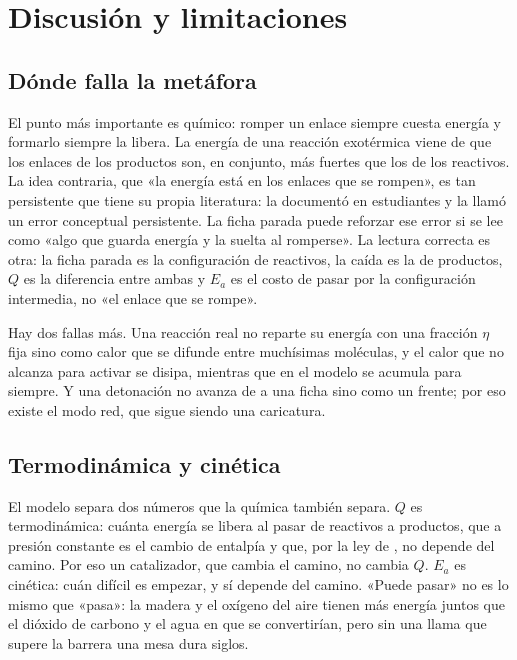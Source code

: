 \documentclass[11pt,a4paper]{article}
\begin{document}
\section{Discusión y limitaciones}\label{sec:discusion}

\subsection{Dónde falla la metáfora}

El punto más importante es químico: romper un enlace siempre cuesta energía y formarlo siempre la libera. La energía de una reacción exotérmica viene de que los enlaces de los productos son, en conjunto, más fuertes que los de los reactivos. La idea contraria, que «la energía está en los enlaces que se rompen», es tan persistente que tiene su propia literatura: \textcite{boo1998} la documentó en estudiantes y \textcite{galley2004} la llamó un error conceptual persistente. La ficha parada puede reforzar ese error si se lee como «algo que guarda energía y la suelta al romperse». La lectura correcta es otra: la ficha parada es la configuración de reactivos, la caída es la de productos, $Q$ es la diferencia entre ambas y $E_a$ es el costo de pasar por la configuración intermedia, no «el enlace que se rompe».

Hay dos fallas más. Una reacción real no reparte su energía con una fracción $\eta$ fija sino como calor que se difunde entre muchísimas moléculas, y el calor que no alcanza para activar se disipa, mientras que en el modelo se acumula para siempre. Y una detonación no avanza de a una ficha sino como un frente; por eso existe el modo red, que sigue siendo una caricatura.

\subsection{Termodinámica y cinética}

El modelo separa dos números que la química también separa. $Q$ es termodinámica: cuánta energía se libera al pasar de reactivos a productos, que a presión constante es el cambio de entalpía y que, por la ley de \textcite{hess1840}, no depende del camino. Por eso un catalizador, que cambia el camino, no cambia $Q$. $E_a$ es cinética: cuán difícil es empezar, y sí depende del camino. «Puede pasar» no es lo mismo que «pasa»: la madera y el oxígeno del aire tienen más energía juntos que el dióxido de carbono y el agua en que se convertirían, pero sin una llama que supere la barrera una mesa dura siglos.
\end{document}
